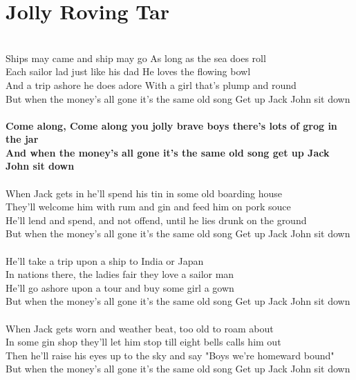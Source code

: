 \documentclass[letterpaper,9pt]{article}
\begin{document}
\section{Jolly Roving Tar}
\noindent
\\Ships may came and ship may go As long as the sea does roll
\\Each sailor lad just like his dad He loves the flowing bowl
\\And a trip ashore he does adore With a girl that's plump and round 
\\But when the money's all gone it's the same old song Get up Jack John sit down
\\
\\\textbf{Come along, Come along you jolly brave boys there’s lots of grog in the jar
\\And when the money's all gone it's the same old song get up Jack John sit down}
\\
\\When Jack gets in he'll spend his tin in some old boarding house
\\They'll welcome him with rum and gin and feed him on pork souce
\\He'll lend and spend, and not offend, until he lies drunk on the ground
\\But when the money's all gone it's the same old song Get up Jack John sit down
\\
\\He'll take a trip upon a ship to India or Japan
\\In nations there, the ladies fair they love a sailor man
\\He'll go ashore upon a tour and buy some girl a gown
\\But when the money's all gone it's the same old song Get up Jack John sit down
\\
\\When Jack gets worn and weather beat, too old to roam about
\\In some gin shop they'll let him stop till eight bells calls him out
\\Then he'll raise his eyes up to the sky and say "Boys we're homeward bound"
\\But when the money's all gone it's the same old song Get up Jack John sit down
\end{document}
